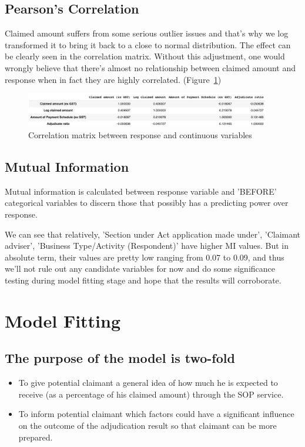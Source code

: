 \documentclass[12pt, b4paper]{article}
\begin{document}
  \subsection{Pearson's Correlation}
  Claimed amount suffers from some serious outlier issues and that's why we log transformed it to bring it back to a close to normal distribution. The effect can be clearly seen in the correlation matrix. Without this adjustment, one would wrongly believe that there's almost no relationship between claimed amount and response when in fact they are highly correlated. (Figure~\ref{fig:correlations})
  \begin{figure}
    \begin{center}
      \includegraphics[width=0.95\textwidth]{plots/correlations.png}
    \end{center}
    \caption{Correlation matrix between response and continuous variables}
    \label{fig:correlations}
  \end{figure}

  \subsection{Mutual Information}
  Mutual information is calculated between response variable and 'BEFORE' categorical variables to discern those that possibly has a predicting power over response. 
  

We can see that relatively, 'Section under Act application made under', 'Claimant adviser', 'Business Type/Activity (Respondent)' have higher MI values. But in absolute term, their values are pretty low ranging from 0.07 to 0.09, and thus we'll not rule out any candidate variables for now and do some significance testing during model fitting stage and hope that the results will corroborate. 


  \section{Model Fitting}
  \subsection{The purpose of the model is two-fold}
  \begin{itemize}
    \item To give potential claimant a general idea of how much he is expected to receive (as a percentage of his claimed amount) through the SOP service.
    \item To inform potential claimant which factors could have a significant influence on the outcome of the adjudication result so that claimant can be more prepared.
  \end{itemize}
\end{document}
